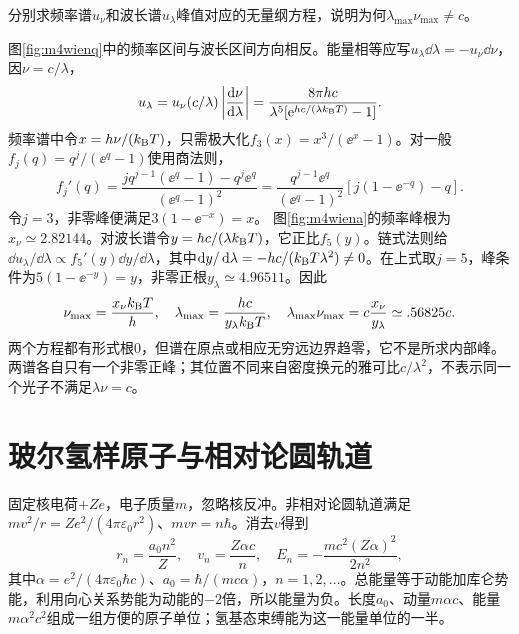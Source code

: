 \begin{example}\label{ex:m4wien}
分别求频率谱$u_\nu$和波长谱$u_\lambda$峰值对应的无量纲方程，说明为何$\lambda_{\max}\nu_{\max}\ne c$。
\end{example}
\begin{solution}
图\ref{fig:m4wienq}中的频率区间与波长区间方向相反。能量相等应写$u_\lambda\dd\lambda=-u_\nu\dd\nu$，因$\nu=c/\lambda$，
\[
 u_\lambda=u_\nu(c/\lambda)\left|\frac{\mathop{}\!\mathrm d\nu}{\mathop{}\!\mathrm d\lambda}\right|
 =\frac{8\pi hc}{\lambda^5[\mathrm e^{hc/(\lambda k_{\mathrm B} T)}-1]}.
\]
频率谱中令$x=h\nu/(k_{\mathrm B} T)$，只需极大化$f_3(x)=x^3/(\ee^x-1)$。对一般$f_j(q)=q^j/(\ee^q-1)$使用商法则，
\[
 f_j'(q)=\frac{jq^{j-1}(\ee^q-1)-q^j\ee^q}{(\ee^q-1)^2}
 =\frac{q^{j-1}\ee^q}{(\ee^q-1)^2}
 [j(1-\ee^{-q})-q].
\]
令$j=3$，非零峰便满足$3(1-\ee^{-x})=x$。
图\ref{fig:m4wiena}的频率峰根为$x_\nu\simeq2.82144$。对波长谱令$y=hc/(\lambda k_{\mathrm B} T)$，它正比$f_5(y)$。链式法则给$\dd u_\lambda/\dd\lambda\propto f_5'(y)\dd y/\dd\lambda$，其中$\mathop{}\!\mathrm d y/\mathop{}\!\mathrm d\lambda=-hc/(k_{\mathrm B} T\lambda^2)\ne0$。在上式取$j=5$，峰条件为$5(1-\ee^{-y})=y$，非零正根$y_\lambda\simeq4.96511$。因此
\[
 \nu_{\max}=\frac{x_\nu k_{\mathrm B} T}h,\quad
 \lambda_{\max}=\frac{hc}{y_\lambda k_{\mathrm B} T},\quad
 \lambda_{\max}\nu_{\max}=c\frac{x_\nu}{y_\lambda}\simeq.56825c.
\]
两个方程都有形式根0，但谱在原点或相应无穷远边界趋零，它不是所求内部峰。两谱各自只有一个非零正峰；其位置不同来自密度换元的雅可比$c/\lambda^2$，不表示同一个光子不满足$\lambda\nu=c$。
\end{solution}

\section{玻尔氢样原子与相对论圆轨道}\label{th:m4bohr}
固定核电荷$+Ze$，电子质量$m$，忽略核反冲。非相对论圆轨道满足$m v^2/r=Ze^2/(4\pi\varepsilon_0r^2)$、$mvr=n\hbar$。消去$v$得到
\[
 r_n=\frac{a_0n^2}Z,\quad v_n=\frac{Z\alpha c}n,\quad
 E_n=-\frac{mc^2(Z\alpha)^2}{2n^2},
\]
其中$\alpha=e^2/(4\pi\varepsilon_0\hbar c)$、$a_0=\hbar/(mc\alpha)$，$n=1,2,\ldots$。总能量等于动能加库仑势能，利用向心关系势能为动能的$-2$倍，所以能量为负。长度$a_0$、动量$m\alpha c$、能量$m\alpha^2c^2$组成一组方便的原子单位；氢基态束缚能为这一能量单位的一半。

